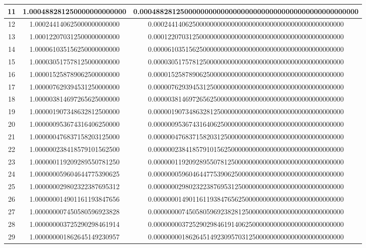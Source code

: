\documentclass{article}
\begin{document}
\begin{itemize}
\begin{longtable}{|c||c|c|}
		11 & 1.000488281250000000000000 & 0.000488281250000000000000000000000000000000000000000000 \\ \hline 
		12 & 1.000244140625000000000000 & 0.000244140625000000000000000000000000000000000000000000 \\ \hline 
		13 & 1.000122070312500000000000 & 0.000122070312500000000000000000000000000000000000000000 \\ \hline 
		14 & 1.000061035156250000000000 & 0.000061035156250000000000000000000000000000000000000000 \\ \hline 
		15 & 1.000030517578125000000000 & 0.000030517578125000000000000000000000000000000000000000 \\ \hline 
		16 & 1.000015258789062500000000 & 0.000015258789062500000000000000000000000000000000000000 \\ \hline 
		17 & 1.000007629394531250000000 & 0.000007629394531250000000000000000000000000000000000000 \\ \hline 
		18 & 1.000003814697265625000000 & 0.000003814697265625000000000000000000000000000000000000 \\ \hline 
		19 & 1.000001907348632812500000 & 0.000001907348632812500000000000000000000000000000000000 \\ \hline 
		20 & 1.000000953674316406250000 & 0.000000953674316406250000000000000000000000000000000000 \\ \hline 
		21 & 1.000000476837158203125000 & 0.000000476837158203125000000000000000000000000000000000 \\ \hline 
		22 & 1.000000238418579101562500 & 0.000000238418579101562500000000000000000000000000000000 \\ \hline 
		23 & 1.000000119209289550781250 & 0.000000119209289550781250000000000000000000000000000000 \\ \hline 
		24 & 1.000000059604644775390625 & 0.000000059604644775390625000000000000000000000000000000 \\ \hline 
		25 & 1.000000029802322387695312 & 0.000000029802322387695312500000000000000000000000000000 \\ \hline 
		26 & 1.000000014901161193847656 & 0.000000014901161193847656250000000000000000000000000000 \\ \hline 
		27 & 1.000000007450580596923828 & 0.000000007450580596923828125000000000000000000000000000 \\ \hline 
		28 & 1.000000003725290298461914 & 0.000000003725290298461914062500000000000000000000000000 \\ \hline 
		29 & 1.000000001862645149230957 & 0.000000001862645149230957031250000000000000000000000000 \\ \hline 

\end{longtable}
\end{itemize}
\end{document}
